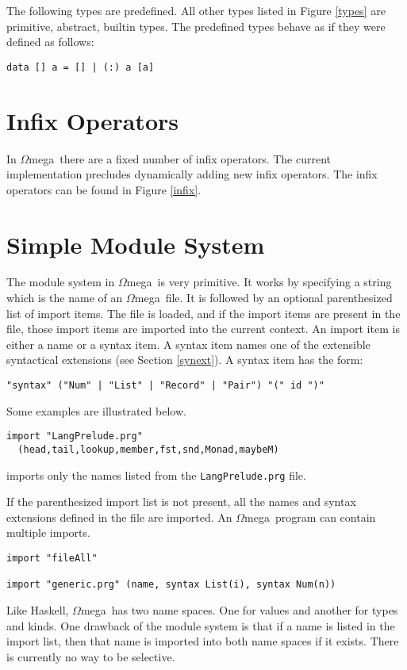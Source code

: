 \documentclass[11pt,twoside]{article}
\newcommand{\om}{$\Omega$mega}
\begin{document}
The following types are predefined. All other types listed in Figure \ref{types}
are primitive, abstract, builtin types. The
predefined types behave as if they were defined as follows:



\begin{verbatim}
data [] a = [] | (:) a [a]
\end{verbatim}

\section{Infix Operators} \label{op}
In \om\ there are a fixed number of infix operators. The current implementation
precludes dynamically adding new infix operators. The infix operators can be
found in Figure \ref{infix}.


\section{Simple Module System} \label{module}
The module system in \om\ is very primitive. It works by specifying
a string which is the name of an \om\ file. It is followed
by an optional parenthesized list of import items. The file is loaded, and 
if the import items are present in the file, those import items
are imported into the current context. An import item is either a name
or a syntax item. A syntax item names one of the extensible syntactical extensions
(see Section \ref{synext}). A syntax
item has the form: 
\begin{verbatim}
"syntax" ("Num" | "List" | "Record" | "Pair") "(" id ")"
\end{verbatim}
Some examples are illustrated below.
\begin{verbatim}
import "LangPrelude.prg" 
  (head,tail,lookup,member,fst,snd,Monad,maybeM)
\end{verbatim}
imports only the names listed from the {\tt LangPrelude.prg} file.

If the parenthesized import list is not present, all the names and syntax
extensions defined in the file are imported.
An \om\ program can contain multiple imports. 
\begin{verbatim}
import "fileAll"

import "generic.prg" (name, syntax List(i), syntax Num(n))
\end{verbatim}

Like Haskell, \om\ has
two name spaces. One for values and another for types and kinds. One drawback
of the module system is that if a name is listed in the import list, then
that name is imported into both name spaces if it exists. There is currently
no way to be selective.
\end{document}
